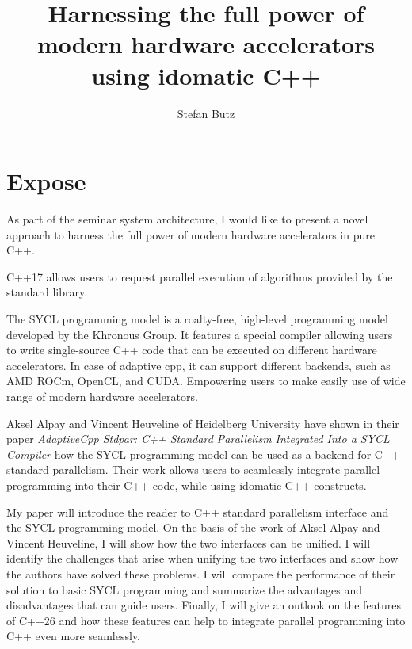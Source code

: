 \documentclass[manuscript,nonacm]{acmart}
\title{Harnessing the full power of modern hardware accelerators using idomatic C++}
\author{Stefan Butz}
\affiliation{%
    \institution{University of Hagen}
    \city{Hagen}
    \country{Germany}
}
\begin{document}
\maketitle

\section{Expose}

As part of the seminar system architecture, I would like to present a novel approach to harness the full power of
modern hardware accelerators in pure C++.

C++17 allows users to request parallel execution of algorithms provided by the standard library.

The SYCL programming model is a roalty-free, high-level programming model developed by the Khronous Group.
It features a special compiler allowing users to write single-source C++ code that can be executed on different hardware accelerators.
In case of adaptive cpp, it can support different backends, such as AMD ROCm, OpenCL, and CUDA.
Empowering users to make easily use of wide range of modern hardware accelerators.

Aksel Alpay and Vincent Heuveline of Heidelberg University have shown in their paper
{\it AdaptiveCpp Stdpar: C++ Standard Parallelism Integrated Into a SYCL Compiler} how the SYCL programming model can be used as a
backend for C++ standard parallelism.
Their work allows users to seamlessly integrate parallel programming into their C++ code, while using idomatic C++ constructs.

My paper will introduce the reader to C++ standard parallelism interface and the SYCL programming model.
On the basis of the work of Aksel Alpay and Vincent Heuveline, I will show how the two interfaces can be unified.
I will identify the challenges that arise when unifying the two interfaces and show how the authors have solved these problems.
I will compare the performance of their solution to basic SYCL programming and summarize the advantages and disadvantages that can guide users.
Finally, I will give an outlook on the features of C++26 and how these features can help to integrate parallel programming into
C++ even more seamlessly.

%
%
\end{document}
